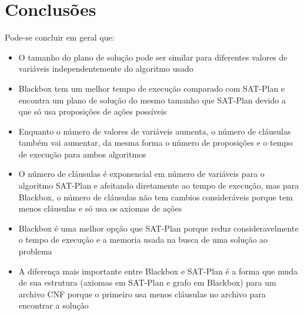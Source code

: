 \section{Conclusões}
	Pode-se concluir em geral que:\\
	\begin{itemize}
		\item O tamanho do plano de solução pode ser similar para diferentes valores de variáveis independentemente do algoritmo usado
		\item Blackbox tem um melhor tempo de execução comparado com SAT-Plan e encontra um plano de solução do mesmo tamanho que SAT-Plan devido a que só usa proposições de ações possíveis
		\item Enquanto o número de valores de variáveis aumenta, o número de cláusulas também vai aumentar, da mesma forma o número de proposições e o tempo de execução para ambos algoritmos
		\item O número de cláusulas é exponencial em número de variáveis para o algoritmo SAT-Plan e afeitando diretamente ao tempo de execução, mas para Blackbox, o número de cláusulas não tem cambios consideráveis porque tem menos cláusulas e só usa os axiomas de ações
		\item Blackbox é uma melhor opção que SAT-Plan porque reduz consideravelmente o tempo de execução e a memoria usada na busca de uma solução ao problema
		\item A diferença mais importante entre Blackbox e SAT-Plan é a forma que muda de sua estrutura (axiomas em SAT-Plan e grafo em Blackbox) para um archivo CNF porque o primeiro usa menos cláusulas no archivo para encontrar a solução
	\end{itemize}
\clearpage